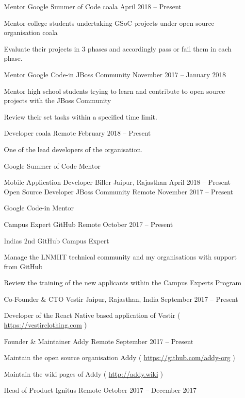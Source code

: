 \begin{cventries}
	\cventry
	{Mentor}
	{Google Summer of Code}
	{coala}
	{April 2018 – Present}
	{\begin{cvitems}
		\item {Mentor college students undertaking GSoC projects under open source organisation coala}
		\item {Evaluate their projects in 3 phases and accordingly pass or fail them in each phase.}
		\end{cvitems}}
	\cventry
	{Mentor}
	{Google Code-in}
	{JBoss Community}
	{November 2017 – January 2018}
	{\begin{cvitems}
		\item {Mentor high school students trying to learn and contribute to open source projects with the JBoss Community}
		\item {Review their set tasks within a specified time limit.}
		\end{cvitems}}
	\cventry
	{Developer}
	{coala}
	{Remote}
	{February 2018 – Present}
	{\begin{cvitems}
		\item {One of the lead developers of the organisation.}
		\item {Google Summer of Code Mentor}
		\end{cvitems}}
	\cventry
	{Mobile Application Developer}
	{Biller}
	{Jaipur, Rajasthan}
	{April 2018 – Present}
	{}
	\cventry
	{Open Source Developer}
	{JBoss Community}
	{Remote}
	{November 2017 – Present}
	{\begin{cvitems}
    {Google Code-in Mentor}
    \end{cvitems}}
    \cventry
	{Campus Expert}
	{GitHub}
	{Remote}
	{October 2017 – Present}
	{\begin{cvitems}
		\item {India\textquotesingle{}s 2nd GitHub Campus Expert}
		\item {Manage the LNMIIT technical community and my organisations with support from GitHub}
		\item {Review the training of the new applicants within the Campus Experts Program}
		\end{cvitems}}
    \cventry
	{Co-Founder \& CTO}
	{Vestir}
	{Jaipur, Rajasthan, India}
	{September 2017 – Present}
    {\begin{cvitems}
    {Developer of the React Native based application of Vestir ( \url{https://vestirclothing.com} )}
    \end{cvitems}}
	\cventry
	{Founder \& Maintainer}
	{Addy}
	{Remote}
	{September 2017 – Present}
	{\begin{cvitems}
		\item {Maintain the open source organisation Addy ( \url{https://github.com/addy-org} )}
		\item {Maintain the wiki pages of Addy ( \url{http://addy.wiki} )}
		\end{cvitems}}
	\cventry
	{Head of Product}
	{Ignitus}
	{Remote}
	{October 2017 – December 2017}
	{}
\end{cventries}
